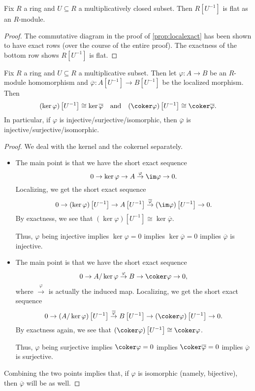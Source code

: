 \begin{corollary} \label{cor:localflat}
	Fix $R$ a ring and $U\subseteq R$ a multiplicatively closed subset. Then $R\left[U^{-1}\right]$ is flat as an $R$-module.
\end{corollary}
\begin{proof}
	The commutative diagram in the proof of \autoref{prop:localexact} has been shown to have exact rows (over the course of the entire proof). The exactness of the bottom row shows $R\left[U^{-1}\right]$ is flat.
\end{proof}
\begin{corollary} \label{cor:localizekercoker}
	Fix $R$ a ring and $U\subseteq R$ a multiplicative subset. Then let $\varphi:A\to B$ be an $R$-module homomorphism and $\overline\varphi:A\left[U^{-1}\right]\to B\left[U^{-1}\right]$ be the localized morphism. Then
	\[(\ker\varphi)\left[U^{-1}\right]\cong\ker\overline\varphi\quad\text{and}\quad(\coker\varphi)\left[U^{-1}\right]\cong\coker\overline\varphi.\]
	In particular, if $\varphi$ is injective/surjective/isomorphic, then $\overline\varphi$ is injective/surjective/isomorphic.
\end{corollary}
\begin{proof}
	We deal with the kernel and the cokernel separately.
	\begin{itemize}
		\item The main point is that we have the short exact sequence
		\[0\to\ker\varphi\to A\stackrel\varphi\to\im\varphi\to0.\]
		Localizing, we get the short exact sequence
		\[0\to(\ker\varphi)\left[U^{-1}\right]\to A\left[U^{-1}\right]\stackrel{\overline\varphi}\to(\im\varphi)\left[U^{-1}\right]\to0.\]
		By exactness, we see that $(\ker\varphi)\left[U^{-1}\right]\cong\ker\overline\varphi$.
		
		Thus, $\varphi$ being injective implies $\ker\varphi=0$ implies $\ker\overline\varphi=0$ implies $\overline\varphi$ is injective.

		\item The main point is that we have the short exact sequence
		\[0\to A/\ker\varphi\stackrel\varphi\to B\to\coker\varphi\to0,\]
		where $\stackrel\varphi\to$ is actually the induced map. Localizing, we get the short exact sequence
		\[0\to(A/\ker\varphi)\left[U^{-1}\right]\stackrel{\overline\varphi}\to B\left[U^{-1}\right]\to(\coker\varphi)\left[U^{-1}\right]\to0.\]
		By exactness again, we see that $(\coker\varphi)\left[U^{-1}\right]\cong\coker\varphi$.
		
		Thus, $\varphi$ being surjective implies $\coker\varphi=0$ implies $\coker\overline\varphi=0$ implies $\overline\varphi$ is surjective.
	\end{itemize}
	Combining the two points implies that, if $\varphi$ is isomorphic (namely, bijective), then $\overline\varphi$ will be as well.
\end{proof}
